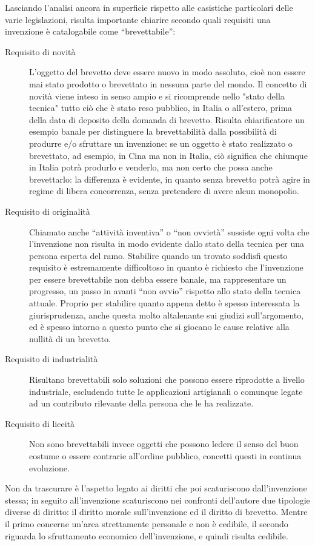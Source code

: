 Lasciando l'analisi ancora in superficie rispetto alle casistiche particolari delle varie legislazioni, risulta importante chiarire secondo quali requisiti una invenzione è catalogabile come ``brevettabile'':
\begin{description}
 \item[Requisito di novità] L'oggetto del brevetto deve essere nuovo in modo assoluto, cioè non essere mai stato prodotto o brevettato in nessuna parte del mondo. Il concetto di novità viene inteso in senso ampio e si ricomprende nello "stato della tecnica" tutto ciò che è stato reso pubblico, in Italia o all’estero, prima della data di deposito della domanda di brevetto. Risulta chiarificatore un esempio banale per distinguere la brevettabilità dalla possibilità di produrre e/o sfruttare un invenzione: se un oggetto è stato realizzato o brevettato, ad esempio, in Cina ma non in Italia, ciò significa che chiunque in Italia potrà produrlo e venderlo, ma non certo che possa anche brevettarlo: la differenza è evidente, in quanto senza brevetto potrà agire in regime di libera concorrenza, senza pretendere di avere alcun monopolio.
\item [Requisito di originalità] Chiamato anche ``attività inventiva'' o ``non ovvietà'' sussiste ogni volta che l'invenzione non risulta in modo evidente dallo stato della tecnica per una persona esperta del ramo. Stabilire quando un trovato soddisfi questo requisito è estremamente difficoltoso in quanto è richiesto che l'invenzione per essere brevettabile non debba essere banale, ma rappresentare un progresso, un passo in avanti ``non ovvio'' rispetto allo stato della tecnica attuale. Proprio per stabilire quanto appena detto è spesso interessata la giurisprudenza, anche questa molto altalenante sui giudizi sull’argomento, ed è spesso intorno a questo punto che si giocano le cause relative alla nullità di un brevetto.
\item [Requisito di industrialità]Risultano brevettabili solo soluzioni che possono essere riprodotte a livello industriale, escludendo tutte le applicazioni artigianali o comunque legate ad un contributo rilevante della persona che le ha realizzate.
\item [Requisito di liceità]Non sono brevettabili invece oggetti che possono ledere il senso del buon costume o essere contrarie all'ordine pubblico, concetti questi in continua evoluzione.
 \end{description}

Non da trascurare è l'aspetto legato ai diritti che poi scaturiscono dall'invenzione stessa; in seguito all'invenzione scaturiscono nei confronti dell'autore due tipologie diverse di diritto: il diritto morale sull'invenzione ed il diritto di brevetto. Mentre il primo concerne un'area strettamente personale e non è cedibile, il secondo riguarda lo sfruttamento economico dell'invenzione, e quindi risulta cedibile.
